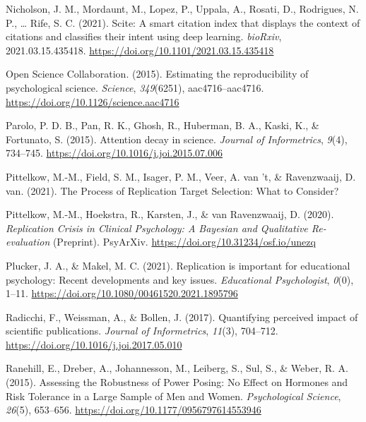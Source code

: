\documentclass[
  english,
  jou,floatsintext]{apa6}
\newlength{\cslhangindent}
\newlength{\cslentryspacingunit} %
\newenvironment{CSLReferences}[2] %
 {%
  \setlength{\parindent}{0pt}
  \ifodd #1
  \let\oldpar\par
  \def\par{\hangindent=\cslhangindent\oldpar}
  \fi
  \setlength{\parskip}{#2\cslentryspacingunit}
 }%
 {}
\begin{document}
\begin{CSLReferences}{1}{0}
\leavevmode{}%
Nicholson, J. M., Mordaunt, M., Lopez, P., Uppala, A., Rosati, D., Rodrigues, N. P., \ldots{} Rife, S. C. (2021). Scite: A smart citation index that displays the context of citations and classifies their intent using deep learning. \emph{bioRxiv}, 2021.03.15.435418. \url{https://doi.org/10.1101/2021.03.15.435418}

\leavevmode{}%
Open Science Collaboration. (2015). Estimating the reproducibility of psychological science. \emph{Science}, \emph{349}(6251), aac4716--aac4716. \url{https://doi.org/10.1126/science.aac4716}

\leavevmode{}%
Parolo, P. D. B., Pan, R. K., Ghosh, R., Huberman, B. A., Kaski, K., \& Fortunato, S. (2015). Attention decay in science. \emph{Journal of Informetrics}, \emph{9}(4), 734--745. \url{https://doi.org/10.1016/j.joi.2015.07.006}

\leavevmode{}%
Pittelkow, M.-M., Field, S. M., Isager, P. M., Veer, A. van 't, \& Ravenzwaaij, D. van. (2021). The {Process} of {Replication Target Selection}: {What} to {Consider}?

\leavevmode{}%
Pittelkow, M.-M., Hoekstra, R., Karsten, J., \& van Ravenzwaaij, D. (2020). \emph{Replication {Crisis} in {Clinical Psychology}: {A Bayesian} and {Qualitative Re}-evaluation} (Preprint). {PsyArXiv}. \url{https://doi.org/10.31234/osf.io/unezq}

\leavevmode{}%
Plucker, J. A., \& Makel, M. C. (2021). Replication is important for educational psychology: {Recent} developments and key issues. \emph{Educational Psychologist}, \emph{0}(0), 1--11. \url{https://doi.org/10.1080/00461520.2021.1895796}

\leavevmode{}%
Radicchi, F., Weissman, A., \& Bollen, J. (2017). Quantifying perceived impact of scientific publications. \emph{Journal of Informetrics}, \emph{11}(3), 704--712. \url{https://doi.org/10.1016/j.joi.2017.05.010}

\leavevmode{}%
Ranehill, E., Dreber, A., Johannesson, M., Leiberg, S., Sul, S., \& Weber, R. A. (2015). Assessing the {Robustness} of {Power Posing}: {No Effect} on {Hormones} and {Risk Tolerance} in a {Large Sample} of {Men} and {Women}. \emph{Psychological Science}, \emph{26}(5), 653--656. \url{https://doi.org/10.1177/0956797614553946}


\end{CSLReferences}
\end{document}
